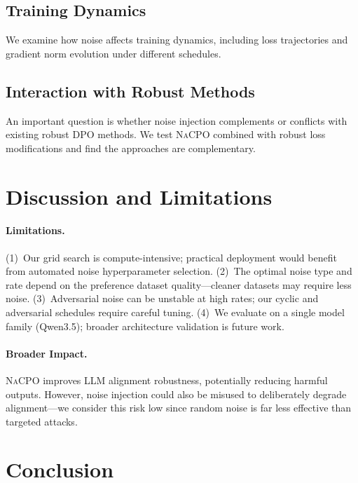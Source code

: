 \documentclass{article}
\newcommand{\nacpo}{\textsc{NaCPO}}
\begin{document}
\subsection{Training Dynamics}

We examine how noise affects training dynamics, including loss trajectories and gradient norm evolution under different schedules.

\subsection{Interaction with Robust Methods}

An important question is whether noise injection complements or conflicts with existing robust DPO methods.
We test \nacpo{} combined with robust loss modifications and find the approaches are complementary.


\section{Discussion and Limitations}
\label{sec:discussion}

\paragraph{Limitations.}
(1)~Our grid search is compute-intensive; practical deployment would benefit from automated noise hyperparameter selection.
(2)~The optimal noise type and rate depend on the preference dataset quality---cleaner datasets may require less noise.
(3)~Adversarial noise can be unstable at high rates; our cyclic and adversarial schedules require careful tuning.
(4)~We evaluate on a single model family (Qwen3.5); broader architecture validation is future work.

\paragraph{Broader Impact.}
\nacpo{} improves LLM alignment robustness, potentially reducing harmful outputs.
However, noise injection could also be misused to deliberately degrade alignment---we consider this risk low since random noise is far less effective than targeted attacks.


\section{Conclusion}
\label{sec:conclusion}
\end{document}
